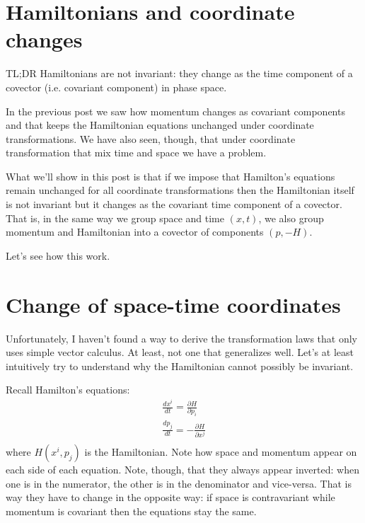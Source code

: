 \documentclass[aps,pra,10pt,floatfix,nofootinbib]{revtex4-1}
\theoremstyle{definition}
\begin{document}
\section{Hamiltonians and coordinate changes}

TL;DR Hamiltonians are not invariant: they change as the time component of a covector (i.e. covariant component) in phase space.

In the previous post we saw how momentum changes as covariant components and that keeps the Hamiltonian equations unchanged under coordinate transformations. We have also seen, though, that under coordinate transformation that mix time and space we have a problem.

What we'll show in this post is that if we impose that Hamilton's equations remain unchanged for all coordinate transformations then the Hamiltonian itself is not invariant but it changes as the covariant time component of a covector. That is, in the same way we group space and time $(x, t)$, we also group momentum and Hamiltonian into a covector of components $(p, -H)$.

Let's see how this work.

\section{Change of space-time coordinates}

Unfortunately, I haven't found a way to derive the transformation laws that only uses simple vector calculus. At least, not one that generalizes well. Let's at least intuitively try to understand why the Hamiltonian cannot possibly be invariant.

Recall Hamilton's equations:
\begin{equation}
\begin{aligned}
\frac{dx^i}{dt} = \frac{\partial H}{\partial p_i}  \\
\frac{dp_j}{dt} = - \frac{\partial H}{\partial x^j}  \\
\end{aligned}
\label{Hamilton}
\end{equation}
where $H(x^i,p_j)$ is the Hamiltonian. Note how space and momentum appear on each side of each equation. Note, though, that they always appear inverted: when one is in the numerator, the other is in the denominator and vice-versa. That is way they have to change in the opposite way: if space is contravariant while momentum is covariant then the equations stay the same.
\end{document}
